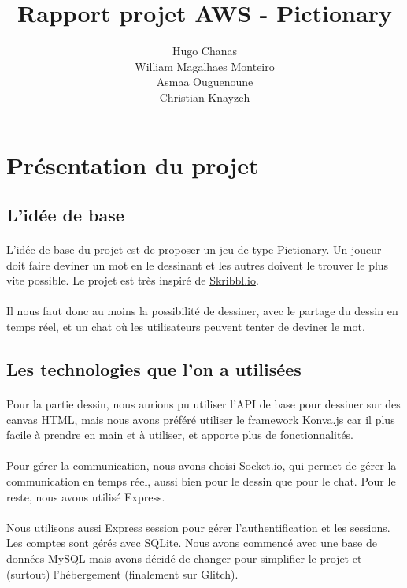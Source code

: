 \documentclass[11pt,a4paper]{article}
\date{}
\title{Rapport projet AWS - Pictionary}
\author{ Hugo Chanas \\ William Magalhaes Monteiro \\ Asmaa Ouguenoune \\ Christian Knayzeh }
\begin{document}
    \maketitle
    \section{Présentation du projet}
        \subsection{L'idée de base}
            \paragraph{}
            L'idée de base du projet est de proposer un jeu de type Pictionary.
            Un joueur doit faire deviner un mot en le dessinant et les autres doivent le trouver le plus vite possible.
            Le projet est très inspiré de \href{https://skribbl.io/}{Skribbl.io}.
            \paragraph{}
            Il nous faut donc au moins la possibilité de dessiner, avec le partage du dessin en temps réel,
            et un chat où les utilisateurs peuvent tenter de deviner le mot.
        \subsection{Les technologies que l'on a utilisées}
            \paragraph{}
            Pour la partie dessin, nous aurions pu utiliser l'API de base pour dessiner sur des canvas HTML,
            mais nous avons préféré utiliser le framework Konva.js car il plus facile à prendre en main et à utiliser,
            et apporte plus de fonctionnalités.
            \paragraph{}
            Pour gérer la communication, nous avons choisi Socket.io, qui permet de gérer la communication en temps réel,
            aussi bien pour le dessin que pour le chat. Pour le reste, nous avons utilisé Express.
            \paragraph{}
            Nous utilisons aussi Express session pour gérer l'authentification et les sessions.
            Les comptes sont gérés avec SQLite.
            Nous avons commencé avec une base de données MySQL mais avons décidé de changer pour simplifier le projet et (surtout) l'hébergement (finalement sur Glitch).
\end{document}

